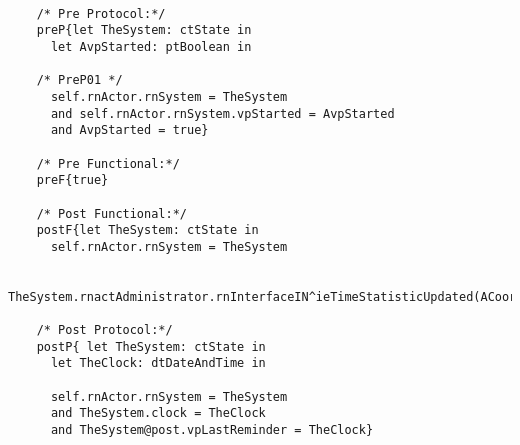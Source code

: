 	\scriptsize
	\vspace{0.5cm}
	\begin{lstlisting}[style=MessirStyle,firstnumber=auto,captionpos=b,caption={\msrmessir (MCL-oriented) specification of the operation \emph{oeUpdateTimingStatistic}.},label=OM-actActivator-oeUpdateTimingStatistic-MCL-LST]

	/* Pre Protocol:*/ 
	preP{let TheSystem: ctState in
	  let AvpStarted: ptBoolean in
	  
	/* PreP01 */
	  self.rnActor.rnSystem = TheSystem
	  and self.rnActor.rnSystem.vpStarted = AvpStarted
	  and AvpStarted = true}
	
	/* Pre Functional:*/
	preF{true}
	
	/* Post Functional:*/ 
	postF{let TheSystem: ctState in
	  self.rnActor.rnSystem = TheSystem
	
	 TheSystem.rnactAdministrator.rnInterfaceIN^ieTimeStatisticUpdated(ACoordStatistic)}
	
	/* Post Protocol:*/ 
	postP{ let TheSystem: ctState in
	  let TheClock: dtDateAndTime in
	  
	  self.rnActor.rnSystem = TheSystem
	  and TheSystem.clock = TheClock
	  and TheSystem@post.vpLastReminder = TheClock}
	
	\end{lstlisting}
	\normalsize 
	
	
	
	





